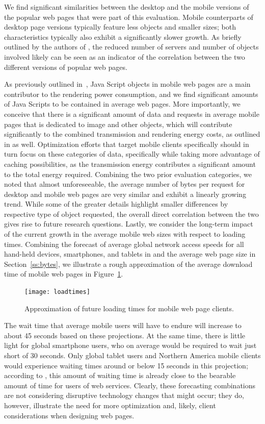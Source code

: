 \documentclass[onecolumn,12pt]{IEEEtran}
\begin{document}
We find significant similarities between the desktop and the mobile versions of the popular web pages that were part of this evaluation. 
Mobile counterparts of desktop page versions typically feature less objects and smaller sizes; both characteristics typically also exhibit a significantly slower growth.
As briefly outlined by the authors of \cite{BuMaSe13}, the reduced number of servers and number of objects involved likely can be seen as an indicator of the correlation between the two different versions of popular web pages.

%
%
As previously outlined in~\cite{ThAgNiBoSi12}, Java Script objects in mobile web pages are a main contributor to the rendering power consumption, and we find significant amounts of Java Scripts to be contained in average web pages.
More importantly, we conceive that there is a significant amount of data and requests in average mobile pages that is dedicated to image and other objects, which will contribute significantly to the combined transmission and rendering energy costs, as outlined in \cite{ThAgNiBoSi12} as well.
Optimization efforts that target mobile clients specifically should in turn focus on these categories of data, specifically while taking more advantage of caching possibilities, as the transmission energy contributes a significant amount to the total energy required.
%
%
Combining the two prior evaluation categories, we noted that almost unforeseeable, the average number of bytes per request for desktop and mobile web pages are very similar and exhibit a linearly growing trend.
While some of the greater details highlight smaller differences by respective type of object requested, the overall direct correlation between the two gives rise to future research questions.
%
%
Lastly, we consider the long-term impact of the current growth in the average mobile web sizes with respect to loading times. 
Combining the forecast of average global network access speeds for all hand-held devices, smartphones, and tablets in \cite{Ci13} and the average web page size in Section~\ref{ss:bytes}, we illustrate a rough approximation of the average download time of mobile web pages in Figure~\ref{fig:loading}.
\begin{figure}
	\centering
	\texttt{[image: loadtimes]}
	\caption{Approximation of future loading times for mobile web page clients.\label{fig:loading}}
\end{figure}
The wait time that average mobile users will have to endure will increase to about 45 seconds based on these projections. 
At the same time, there is little light for global smartphone users, who on average would be required to wait just short of 30 seconds.
Only global tablet users and Northern America mobile clients would experience waiting times around or below 15 seconds in this projection; according to \cite{NiUeNa10}, this amount of waiting time is already close to the bearable amount of time for users of web services.
Clearly, these forecasting combinations are not considering disruptive technology changes that might occur; they do, however, illustrate the need for more optimization and, likely, client considerations when designing web pages.
\end{document}
